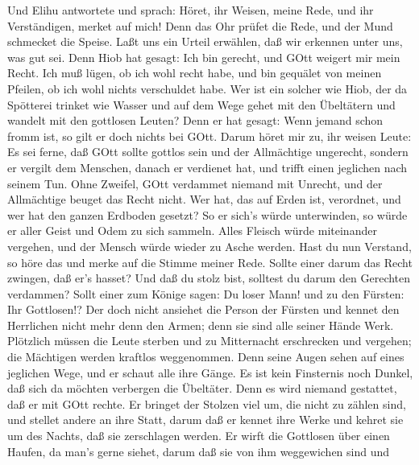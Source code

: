  Und Elihu antwortete und sprach:  Höret, ihr
Weisen, meine Rede, und ihr Verständigen, merket auf mich! 
Denn das Ohr prüfet die Rede, und der Mund schmecket die Speise.
 Laßt uns ein Urteil erwählen, daß wir erkennen unter uns,
was gut sei.  Denn Hiob hat gesagt: Ich bin gerecht, und
GOtt weigert mir mein Recht.  Ich muß lügen, ob ich wohl
recht habe, und bin gequälet von meinen Pfeilen, ob ich wohl nichts
verschuldet habe.  Wer ist ein solcher wie Hiob, der da
Spötterei trinket wie Wasser  und auf dem Wege gehet mit den
Übeltätern und wandelt mit den gottlosen Leuten?  Denn er
hat gesagt: Wenn jemand schon fromm ist, so gilt er doch nichts bei
GOtt.  Darum höret mir zu, ihr weisen Leute: Es sei ferne,
daß GOtt sollte gottlos sein und der Allmächtige ungerecht,
 sondern er vergilt dem Menschen, danach er verdienet hat,
und trifft einen jeglichen nach seinem Tun.  Ohne Zweifel,
GOtt verdammet niemand mit Unrecht, und der Allmächtige beuget das Recht
nicht.  Wer hat, das auf Erden ist, verordnet, und wer hat
den ganzen Erdboden gesetzt?  So er sich's würde
unterwinden, so würde er aller Geist und Odem zu sich sammeln.
 Alles Fleisch würde miteinander vergehen, und der Mensch
würde wieder zu Asche werden.  Hast du nun Verstand, so
höre das und merke auf die Stimme meiner Rede.  Sollte
einer darum das Recht zwingen, daß er's hasset? Und daß du stolz bist,
solltest du darum den Gerechten verdammen?  Sollt einer zum
Könige sagen: Du loser Mann! und zu den Fürsten: Ihr Gottlosen!?
 Der doch nicht ansiehet die Person der Fürsten und kennet
den Herrlichen nicht mehr denn den Armen; denn sie sind alle seiner
Hände Werk.  Plötzlich müssen die Leute sterben und zu
Mitternacht erschrecken und vergehen; die Mächtigen werden kraftlos
weggenommen.  Denn seine Augen sehen auf eines jeglichen
Wege, und er schaut alle ihre Gänge.  Es ist kein
Finsternis noch Dunkel, daß sich da möchten verbergen die Übeltäter.
 Denn es wird niemand gestattet, daß er mit GOtt rechte.
 Er bringet der Stolzen viel um, die nicht zu zählen sind,
und stellet andere an ihre Statt,  darum daß er kennet ihre
Werke und kehret sie um des Nachts, daß sie zerschlagen werden.
 Er wirft die Gottlosen über einen Haufen, da man's gerne
siehet,  darum daß sie von ihm weggewichen sind und
